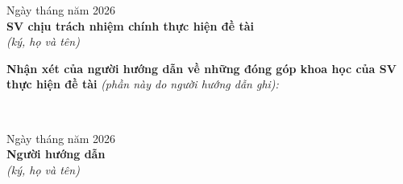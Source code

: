 {%
\vspace{0.5cm}
\begin{flushright}
    Ngày \underline{\quad} tháng \underline{\quad} năm 2026 \\[0.3cm]
    \textbf{SV chịu trách nhiệm chính thực hiện đề tài} \\[0.15cm]
    \textit{(ký, họ và tên)} \\[1.8cm]
\end{flushright}

\vspace{0.1cm}
\noindent\textbf{Nhận xét của người hướng dẫn về những đóng góp khoa học của SV thực hiện đề tài}
\textit{(phần này do người hướng dẫn ghi):}

\vspace{0.2cm}
\noindent\dotfill\\[0.55cm]
\noindent\dotfill

\vspace{0.5cm}
\begin{flushright}
    Ngày \underline{\quad} tháng \underline{\quad} năm 2026 \\[0.3cm]
    \textbf{Người hướng dẫn} \\[0.15cm]
    \textit{(ký, họ và tên)} \\[1.8cm]
\end{flushright}

}